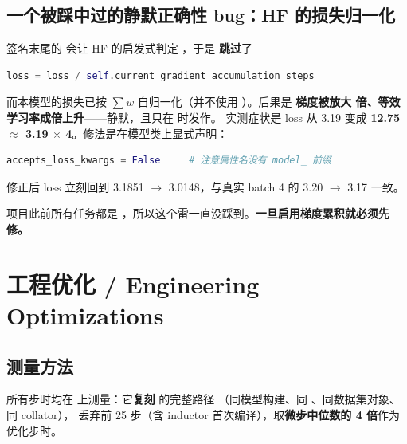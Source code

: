 \documentclass[11pt,openany]{ctexart}
\begin{document}
\subsection{一个被踩中过的静默正确性 bug：HF 的损失归一化}

 签名末尾的  会让 HF 的启发式判定 ，于是  \textbf{跳过}了

\begin{lstlisting}[language=Python]
loss = loss / self.current_gradient_accumulation_steps
\end{lstlisting}

而本模型的损失已按 $\sum w$ 自归一化（并不使用 ）。后果是 \textbf{梯度被放大  倍、等效学习率成倍上升}——静默，且只在  时发作。 实测症状是 loss 从 3.19 变成 \textbf{12.75 $\approx$ 3.19 $\times$ 4}。修法是在模型类上显式声明：

\begin{lstlisting}[language=Python]
accepts_loss_kwargs = False     # 注意属性名没有 model_ 前缀
\end{lstlisting}

修正后 loss 立刻回到 3.1851 $\rightarrow$ 3.0148，与真实 batch 4 的 3.20 $\rightarrow$ 3.17 一致。

\begin{notebox}
项目此前所有任务都是 ，所以这个雷一直没踩到。\textbf{一旦启用梯度累积就必须先修。}
\end{notebox}

\reportrule

\section{工程优化 / Engineering Optimizations}

\subsection{测量方法}

所有步时均在  上测量：它\textbf{复刻}  的完整路径 （同模型构建、同 、同数据集对象、同 collator）， 丢弃前 25 步（含 inductor 首次编译），取\textbf{微步中位数的 4 倍}作为优化步时。
\end{document}
